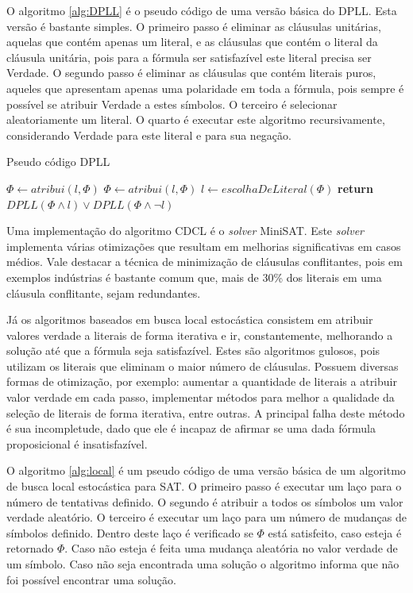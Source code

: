 \documentclass{ufsc-thesis}
\begin{document}
O algoritmo \ref{alg:DPLL} é o pseudo código de uma versão básica do 
DPLL. Esta versão é bastante simples. O primeiro passo é 
eliminar as cláusulas unitárias, aquelas que contém apenas um literal, 
e as cláusulas que contém o literal da cláusula unitária, pois para a fórmula 
ser satisfazível este literal precisa ser Verdade. O segundo passo é 
eliminar as cláusulas que contém literais puros, aqueles que apresentam apenas 
uma polaridade em toda a fórmula, pois sempre é possível se atribuir Verdade a 
estes símbolos. O terceiro é selecionar aleatoriamente um literal. O quarto 
é executar este algoritmo recursivamente, considerando Verdade para este literal 
e para sua negação.

\begin{algorithm}
\caption{Pseudo código DPLL} \label{alg:DPLL}
\begin{algorithmic}[1]
    \State $\Phi \gets atribui(l,\Phi)$
\EndFor
{}
    \State $\Phi \gets atribui(l,\Phi)$
\EndFor
\State $l \gets escolhaDeLiteral(\Phi)$
\State \textbf{return} $DPLL(\Phi \wedge l) \vee DPLL(\Phi \wedge \neg l)$
\EndProcedure
\end{algorithmic}
\end{algorithm}

Uma implementação do algoritmo CDCL é o \textit{solver} MiniSAT\allowbreak\cite{Een03anextensible}.
Este \textit{solver} implementa várias otimizações que resultam 
em melhorias significativas em casos médios. Vale destacar 
a técnica de minimização de cláusulas conflitantes, pois 
em exemplos indústrias é bastante comum que, mais de 30\% 
dos literais em uma cláusula conflitante, sejam redundantes\cite{MiniSatSystemDesc}.

Já os algoritmos baseados em busca local estocástica consistem em atribuir 
valores verdade a literais de forma iterativa e ir, constantemente, 
melhorando a solução até que a fórmula seja satisfazível\cite{Selman95}. Estes são 
algoritmos gulosos, pois utilizam os literais que eliminam o maior 
número de cláusulas. Possuem diversas formas de otimização, 
por exemplo: aumentar a quantidade de literais a atribuir valor verdade 
em cada passo, implementar métodos para melhor a qualidade da seleção de literais 
de forma iterativa, entre outras. A principal falha deste método 
é sua incompletude, dado que ele é incapaz de afirmar se uma dada 
fórmula proposicional é insatisfazível\cite{Hoos2004}.

O algoritmo \ref{alg:local} é um pseudo código de uma versão básica de um 
algoritmo de busca local estocástica para SAT. O primeiro passo é executar 
um laço para o número de tentativas definido. O segundo é atribuir a todos 
os símbolos um valor verdade aleatório. O terceiro é executar um laço 
para um número de mudanças de símbolos definido. Dentro deste laço 
é verificado se $\Phi$ está satisfeito, caso esteja é retornado $\Phi$. 
Caso não esteja é feita uma mudança aleatória no valor verdade de um símbolo.
Caso não seja encontrada uma solução o algoritmo informa que não foi 
possível encontrar uma solução.
\end{document}
